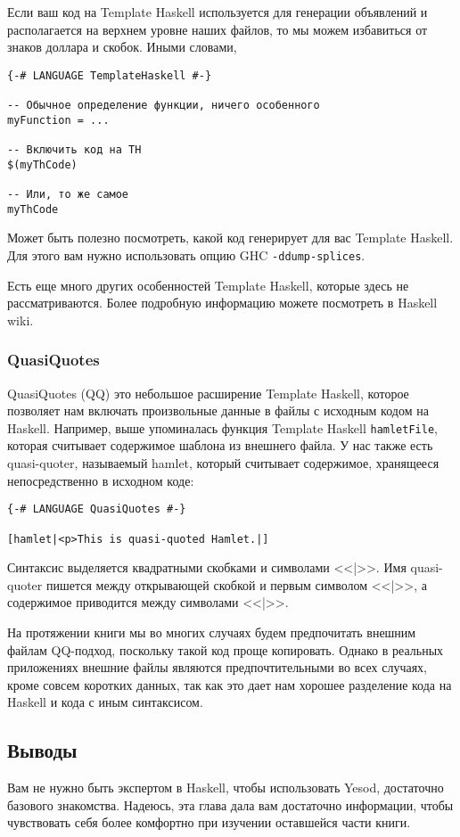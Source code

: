 Если ваш код на Template Haskell используется для генерации объявлений и располагается на верхнем уровне наших файлов, то мы можем избавиться от знаков доллара и скобок. Иными словами,

\begin{lstlisting}
{-# LANGUAGE TemplateHaskell #-}

-- Обычное определение функции, ничего особенного
myFunction = ...

-- Включить код на TH
$(myThCode)

-- Или, то же самое
myThCode
\end{lstlisting}

Может быть полезно посмотреть, какой код генерирует для вас Template Haskell. Для этого вам нужно использовать опцию GHC \lstinline'-ddump-splices'.

Есть еще много других особенностей Template Haskell, которые здесь не рассматриваются. Более подробную информацию можете посмотреть в Haskell wiki.

\subsubsection{QuasiQuotes}

QuasiQuotes (QQ) это небольшое расширение Template Haskell, которое позволяет нам включать произвольные данные в файлы с исходным кодом на Haskell. Например, выше упоминалась функция Template Haskell \lstinline'hamletFile', которая считывает содержимое шаблона из внешнего файла. У нас также есть quasi-quoter, называемый hamlet, который считывает содержимое, хранящееся непосредственно в исходном коде:

\begin{lstlisting}
{-# LANGUAGE QuasiQuotes #-}

[hamlet|<p>This is quasi-quoted Hamlet.|]
\end{lstlisting}

Синтаксис выделяется квадратными скобками и символами <<|>>. Имя quasi-quoter пишется между открывающей скобкой и первым символом <<|>>, а содержимое приводится между символами <<|>>.

На протяжении книги мы во многих случаях будем предпочитать внешним файлам QQ-подход, поскольку такой код проще копировать. Однако в реальных приложениях внешние файлы являются предпочтительными во всех случаях, кроме совсем коротких данных, так как это дает нам хорошее разделение кода на Haskell и кода с иным синтаксисом.

\subsection{Выводы}

Вам не нужно быть экспертом в Haskell, чтобы использовать Yesod, достаточно базового знакомства. Надеюсь, эта глава дала вам достаточно информации, чтобы чувствовать себя более комфортно при изучении оставшейся части книги.